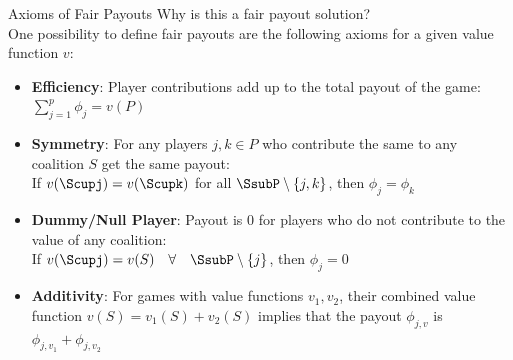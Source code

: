 \documentclass[11pt,compress,t,notes=noshow, aspectratio=169, xcolor=table]{beamer}
\begin{document}
\begin{frame}{Axioms of Fair Payouts}
 Why is this a fair payout solution?
 \\
 One possibility to define fair payouts are the following axioms for a given value function $v$:
  \vspace{0.25cm}
  \begin{itemize}[<+->]
  \itemsep1em
    \item \textbf{Efficiency}: Player contributions add up to the total payout of the game:
      $\sum\nolimits_{j=1}^p\phi_j = v(P)$
    \item \textbf{Symmetry}: For any players $j,k \in P$ who contribute the same to any coalition $S$ get the same payout: \\ 
      If $v(\Scupj) = v(\Scupk)$ for all $\SsubP \setminus\{j,k\}$, then $\phi_j=\phi_k$
    \item \textbf{Dummy/Null Player}: Payout is 0 for players who do not contribute to the value of any coalition: \\
      If $v(\Scupj)=v(S)\quad  \forall \quad \SsubP \setminus \{j\}$, then $\phi_j=0$
    \item \textbf{Additivity}: For games with value functions $v_1, v_2$, their combined value function $v(S) = v_1(S) + v_2(S)$ implies that the payout $\phi_{j,v}$ is $\phi_{j,v_1} + \phi_{j, v_2}$
  \end{itemize}
  \vspace{0.5cm}
  

\end{frame}
\end{document}
